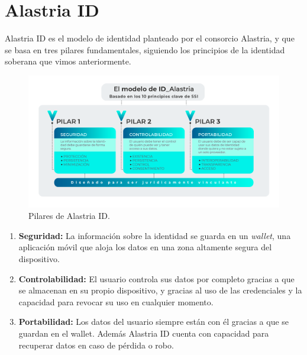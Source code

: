 \section{Alastria ID}
Alastria ID es el modelo de identidad planteado por el consorcio Alastria, y que se basa en tres pilares fundamentales, siguiendo los principios de la identidad soberana que vimos anteriormente.
\begin{figure}[H]
\centerline{\includegraphics[scale=.5]{recursos/ID-Model-Esp-1.png}}
\caption{Pilares de Alastria ID.}
\label{pilares-alastriaid}
\end{figure}
\begin{enumerate}
    \item \textbf{Seguridad:} La información sobre la identidad se guarda en un \textit{wallet}, una aplicación móvil que aloja los datos en una zona altamente segura del dispositivo.
    \item \textbf{Controlabilidad:} El usuario controla sus datos por completo gracias a que se almacenan en su propio dispositivo, y gracias al uso de las credenciales y la capacidad para revocar su uso en cualquier momento.
    \item \textbf{Portabilidad:} Los datos del usuario siempre están con él gracias a que se guardan en el wallet. Además Alastria ID cuenta con capacidad para recuperar datos en caso de pérdida o robo.
\end{enumerate}

